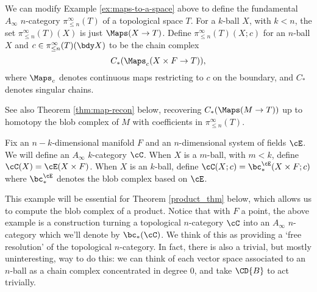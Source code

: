 



\begin{example}
\rm
\label{ex:chains-of-maps-to-a-space}
We can modify Example \ref{ex:maps-to-a-space} above to define the fundamental $A_\infty$ $n$-category $\pi^\infty_{\le n}(T)$ of a topological space $T$.
For a $k$-ball $X$, with $k < n$, the set $\pi^\infty_{\leq n}(T)(X)$ is just $\Maps(X \to T)$.
Define $\pi^\infty_{\leq n}(T)(X; c)$ for an $n$-ball $X$ and $c \in \pi^\infty_{\leq n}(T)(\bdy X)$ to be the chain complex
$$C_*(\Maps_c(X\times F \to T)),$$ where $\Maps_c$ denotes continuous maps restricting to $c$ on the boundary,
and $C_*$ denotes singular chains.
\end{example}

See also Theorem \ref{thm:map-recon} below, recovering $C_*(\Maps(M \to T))$ up to 
homotopy the blob complex of $M$ with coefficients in $\pi^\infty_{\le n}(T)$.

\begin{example}
\rm
\label{ex:blob-complexes-of-balls}
Fix an $n-k$-dimensional manifold $F$ and an $n$-dimensional system of fields $\cE$.
We will define an $A_\infty$ $k$-category $\cC$.
When $X$ is a $m$-ball, with $m<k$, define $\cC(X) = \cE(X\times F)$.
When $X$ is an $k$-ball,
define $\cC(X; c) = \bc^\cE_*(X\times F; c)$
where $\bc^\cE_*$ denotes the blob complex based on $\cE$.
\end{example}

This example will be essential for Theorem \ref{product_thm} below, which allows us to compute the blob complex of a product.
Notice that with $F$ a point, the above example is a construction turning a topological 
$n$-category $\cC$ into an $A_\infty$ $n$-category which we'll denote by $\bc_*(\cC)$.
We think of this as providing a `free resolution' 
of the topological $n$-category. 
In fact, there is also a trivial, but mostly uninteresting, way to do this: 
we can think of each vector space associated to an $n$-ball as a chain complex concentrated in degree $0$, 
and take $\CD{B}$ to act trivially. 


